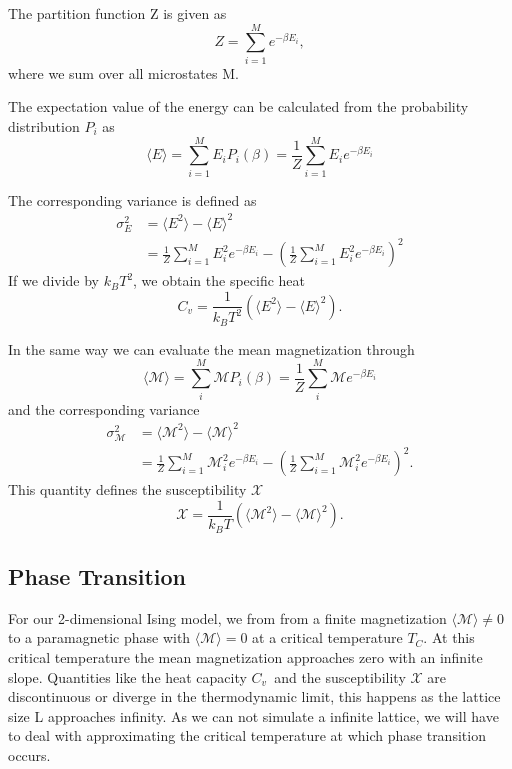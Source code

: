 \documentclass[%
reprint,
nofootinbib,
amsmath,amssymb,
aps,
]{revtex4-1}
\begin{document}
The partition function Z is given as 
\begin{equation}\label{eq:Z}
	Z = \sum_{i=1}^{M}e^{-\beta E_i},
\end{equation} 
where we sum over all microstates M.

The expectation value of the energy can be calculated from the probability distribution $P_i$ as 
\begin{equation}\label{eq:E}
	\langle E\rangle = \sum_{i=1}^{M}E_iP_i(\beta) = \frac{1}{Z}\sum_{i=1}^ME_ie^{-\beta E_i}
\end{equation}

The corresponding variance is defined as 
\begin{equation}
	\begin{split}
\sigma_E^2 &= \langle E^2 \rangle -\langle E\rangle^2 \\
&= \frac{1}{Z}\sum_{i=1}^ME_i^2e^{-\beta E_i} - \left(\frac{1}{Z}\sum_{i=1}^ME_i^2e^{-\beta E_i}\right)^2
	\end{split}
\end{equation}
If we divide by $k_BT^2$, we obtain the specific heat 
\begin{equation}\label{eq:cv}
	C_v = \frac{1}{k_BT^2}\left(\langle E^2 \rangle -\langle E\rangle^2\right).
\end{equation}

In the same way we can evaluate the mean magnetization through 
\begin{equation}\label{eq:M}
	\langle\mathcal{M}\rangle = \sum_i^M\mathcal{M}P_i(\beta) = \frac{1}{Z}\sum_i^M\mathcal{M}e^{-\beta E_i}
\end{equation}
and the corresponding variance 
\begin{equation}
\begin{split} 
		\sigma_\mathcal{M}^2			&=\langle \mathcal{M}^2 \rangle -\langle \mathcal{M}\rangle^2 \\
			&= \frac{1}{Z}\sum_{i=1}^M\mathcal{M}_i^2e^{-\beta E_i} - \left(\frac{1}{Z}\sum_{i=1}^M\mathcal{M}_i^2e^{-\beta E_i}\right)^2.
		\end{split} 
\end{equation}
This quantity defines the susceptibility $\mathcal{X}$
\begin{equation}\label{eq:x}
	\mathcal{X} = \frac{1}{k_BT}\left(\langle \mathcal{M}^2 \rangle -\langle \mathcal{M}\rangle^2\right).
\end{equation}
\subsection{Phase Transition} %
For our 2-dimensional Ising model, we from from a finite magnetization $\langle \mathcal{M} \rangle \neq 0$ to a paramagnetic phase with $\langle \mathcal{M} \rangle = 0$ at a critical temperature $T_C$. At this critical temperature the mean magnetization approaches zero with an infinite slope. Quantities like the heat capacity $C_v$ and the susceptibility $\mathcal{X}$ are discontinuous or diverge in the thermodynamic limit\cite{morten}, this happens as the lattice size L approaches infinity. As we can not simulate a infinite lattice, we will have to deal with approximating the critical temperature at which phase transition occurs. 
\end{document}
